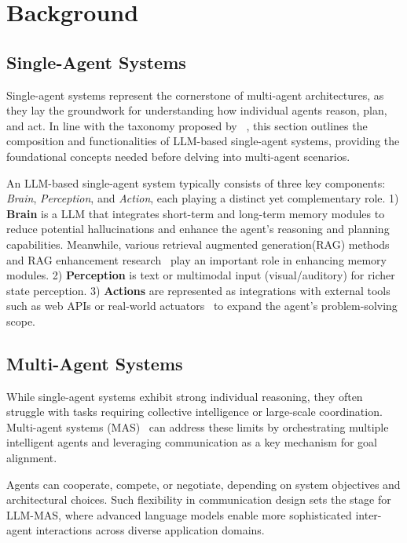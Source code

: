 \section{Background}
\subsection{Single-Agent Systems}
Single-agent systems represent the cornerstone of multi-agent architectures, as they lay the groundwork for understanding how individual agents reason, plan, and act. In line with the taxonomy proposed by ~\cite{agent_survey_1}, this section outlines the composition and functionalities of LLM-based single-agent systems, providing the foundational concepts needed before delving into multi-agent scenarios.

An LLM-based single-agent system typically consists of three key components: \textit{Brain}, \textit{Perception}, and \textit{Action}, each playing a distinct yet complementary role. 1) \textbf{Brain} is a LLM that integrates short-term and long-term memory modules to reduce potential hallucinations and enhance the agent's reasoning and planning capabilities. Meanwhile, various retrieval augmented generation(RAG) methods~\cite{rag_1} and RAG enhancement research~\cite{rag_2} play an important role in enhancing memory modules. 2) \textbf{Perception} is text or multimodal input (visual/auditory) for richer state perception. 
3) \textbf{Actions} are represented as integrations with external tools such as web APIs or real-world actuators~\cite{embodied_agents} to expand the agent’s problem-solving scope.

\subsection{Multi-Agent Systems}
While single-agent systems exhibit strong individual reasoning, they often struggle with tasks requiring collective intelligence or large-scale coordination. Multi-agent systems (MAS)~\cite{mas_define} can address these limits by orchestrating multiple intelligent agents and leveraging communication as a key mechanism for goal alignment. 

Agents can cooperate, compete, or negotiate, depending on system objectives and architectural choices. Such flexibility in communication design sets the stage for LLM-MAS, where advanced language models enable more sophisticated inter-agent interactions across diverse application domains.


